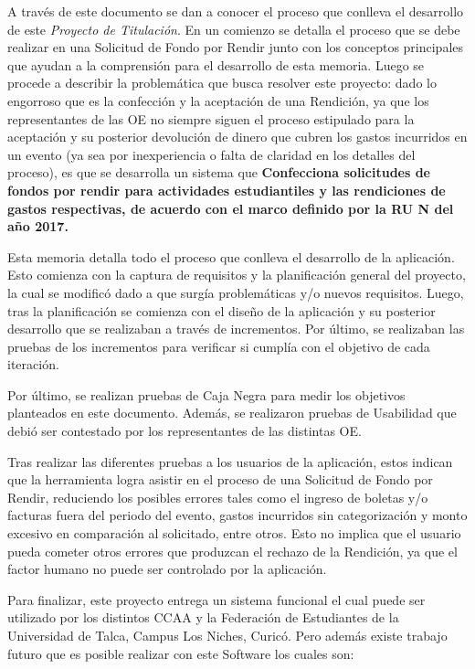 A través de este documento se dan a conocer el proceso que conlleva el desarrollo de este \textit{Proyecto de Titulación}. En un comienzo se detalla el proceso que se debe realizar en una Solicitud de Fondo por Rendir junto con los conceptos principales que ayudan a la comprensión para el desarrollo de esta memoria. Luego se procede a describir la problemática que busca resolver este proyecto: dado lo engorroso que es la confección y la aceptación de una Rendición, ya que los representantes de las OE no siempre siguen el proceso estipulado para la aceptación y su posterior devolución de dinero que cubren los gastos  incurridos en un evento (ya sea por inexperiencia o falta de claridad en los detalles del proceso), es que se desarrolla un sistema que \textbf{Confecciona solicitudes de fondos por rendir para actividades estudiantiles y las rendiciones de gastos respectivas, de acuerdo con el marco definido por la RU N del año 2017.}

Esta memoria detalla todo el proceso que conlleva el desarrollo de la aplicación. Esto comienza con la captura de requisitos y la planificación general del proyecto, la cual se modificó dado a que surgía problemáticas y/o nuevos requisitos. Luego, tras la planificación se comienza con el diseño de la aplicación y su posterior desarrollo que se realizaban a través de incrementos. Por último, se realizaban las pruebas de los incrementos para verificar si cumplía con el objetivo de cada iteración.

Por último, se realizan pruebas de Caja Negra para medir los objetivos planteados en este documento. Además, se realizaron pruebas de Usabilidad que debió ser contestado por los representantes de las distintas OE.

Tras realizar las diferentes pruebas a los usuarios de la aplicación, estos indican que la herramienta logra asistir en el proceso de una Solicitud de Fondo por Rendir, reduciendo los posibles errores tales como el ingreso de boletas y/o facturas fuera del periodo del evento, gastos incurridos sin categorización y monto excesivo en comparación al solicitado, entre otros. Esto no implica que el usuario pueda cometer otros errores que produzcan el rechazo de la Rendición, ya que el factor humano no puede ser controlado por la aplicación. 

Para finalizar, este proyecto entrega un sistema funcional el cual puede ser utilizado por los distintos CCAA y la Federación de Estudiantes de la Universidad de Talca, Campus Los Niches, Curicó. Pero además existe trabajo futuro que es posible realizar con este Software los cuales son:

